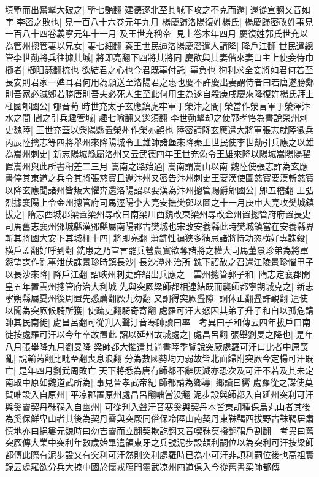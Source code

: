 填塹而出奮擊大破之|{
	塹七艶翻}
建德逐北至其城下攻之不克而還|{
	還從宣翻又音如字}
李密之敗也|{
	見一百八十六卷元年九月}
楊慶歸洛陽復姓楊氏|{
	楊慶歸密改姓事見一百八十四卷義寧元年十一月}
及王世充稱帝|{
	見上卷本年四月}
慶復姓郭氏世充以為管州摠管妻以兄女|{
	妻七細翻}
秦王世民逼洛陽慶濳遣人請降|{
	降戶江翻}
世民遣總管李世勣將兵往據其城|{
	將即亮翻下四將其將同}
慶欲與其妻偕來妻曰主上使妾侍巾櫛者|{
	櫛阻瑟翻梳也}
欲結君之心也今君既辜付託|{
	辜負也}
狥利求全妾將如君何若至長安則君家一婢耳君何用為願送至洛陽君之惠也慶不許慶出妻謂侍者曰若唐遂勝鄭則吾家必滅鄭若勝唐則吾夫必死人生至此何用生為遂自殺庚戌慶來降復姓楊氏拜上柱國郇國公|{
	郇音荀}
時世充太子玄應鎮虎牢軍于榮汴之間|{
	榮當作滎言軍于滎澤汴水之間}
聞之引兵趣管城|{
	趣七喻翻又逡須翻}
李世勣擊却之使郭孝恪為書說榮州刺史魏陸|{
	王世充蓋以滎陽縣置滎州作榮亦誤也}
陸密請降玄應遣大將軍張志就陸徵兵丙辰陸擒志等四將舉州來降陽城令王雄帥諸堡來降秦王世民使李世勣引兵應之以雄為嵩州刺史|{
	新志陽城縣屬洛州又云武德四年王世充偽令王雄來降以陽城嵩陽陽翟置嵩州與此所書稍差二三月}
嵩南之路始通|{
	嵩南謂嵩山以南}
魏陸使張志詐為玄應書停其東道之兵令其將張慈寶且還汴州又密告汴州刺史王要漢使圖慈寶要漢斬慈寶以降玄應聞諸州皆叛大懼奔還洛陽詔以要漢為汴州摠管賜爵郳國公|{
	郳五稽翻}
王弘烈據襄陽上令金州摠管府司馬涇陽李大亮安撫樊鄧以圖之十一月庚申大亮攻樊城鎮拔之|{
	隋志西城郡梁置梁州尋改曰南梁川西魏改東梁州尋改金州置摠管府府置長史司馬舊志襄州鄧城縣漢鄧縣屬南陽郡古樊城也宋改安養縣此時樊城鎮當在安養縣界}
斬其將國大安下其城柵十四|{
	將即亮翻}
蕭銑性褊狹多猜忌諸將恃功恣横好專誅殺|{
	横戶孟翻好呼到翻}
銑患之乃宣言罷兵營農實欲奪諸將之權大司馬董景珍弟為將軍怨望謀作亂事泄伏誅景珍時鎮長沙|{
	長沙潭州治所}
銑下詔赦之召還江陵景珍懼甲子以長沙來降|{
	降戶江翻}
詔峽州刺史許紹出兵應之　雲州摠管郭子和|{
	隋志定襄郡開皇五年置雲州摠管府治大利城}
先與突厥梁師都相連結既而襲師都寧朔城克之|{
	新志寜朔縣屬夏州後周置先悉薦翻厥九勿翻}
又詗得突厥舋隙|{
	詗休正翻舋許覲翻}
遣使以聞為突厥候騎所獲|{
	使疏吏翻騎奇寄翻}
處羅可汗大怒囚其弟子升子和自以孤危請帥其民南徙|{
	處昌呂翻可從刋入聲汙音寒帥讀曰率　考異曰子和傳云四年拔戶口南徙按處羅可汗以今年卒故置此}
詔以延州故城處之|{
	處昌呂翻}
張舉劉旻之降也|{
	是年八月張舉降九月劉旻降}
梁師都大懼遣其尚書陸季覽說突厥處羅可汗曰比者中原喪亂|{
	說輸芮翻比毗至翻喪息浪翻}
分為數國勢均力弱故皆北面歸附突厥今定楊可汗既亡|{
	是年四月劉武周敗亡}
天下將悉為唐有師都不辭灰滅亦恐次及可汗不若及其未定南取中原如魏道武所為|{
	事見晉孝武帝紀}
師都請為鄉導|{
	鄉讀曰嚮}
處羅從之謀使莫賀咄設入自原州|{
	平凉郡置原州處昌呂翻咄當没翻}
泥步設與師都入自延州突利可汗與奚霫契丹靺鞨入自幽州|{
	可從刋入聲汗音寒奚與契丹本皆東胡種保烏丸山者其後為奚保鮮卑山者其後為契丹霫與突厥同俗保冷陘山南契丹東靺鞨西拔野古靺鞨居肅慎地亦曰挹婁元魏時曰勿吉霫而立翻契欺訖翻又音喫靺莫撥翻鞨戶割翻　考異曰舊突厥傳大業中突利年數歲始畢遣領東牙之兵號泥步設頡利嗣位以為突利可汗按梁師都傳此際有泥步設又有突利可汗然則突利處羅時已為小可汗非頡利嗣位後也高祖實録云處羅欲分兵大掠中國於懷戎鴈門靈武凉州四道俱入今從舊書梁師都傳}
